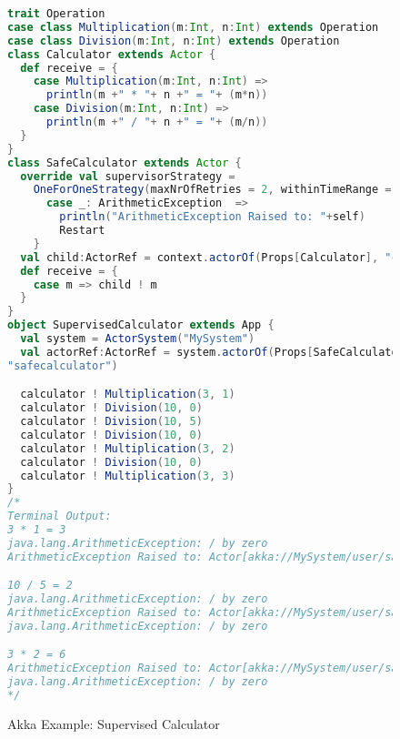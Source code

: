 \begin{figure}[!p]

  \begin{lstlisting}[language=scala]
trait Operation
case class Multiplication(m:Int, n:Int) extends Operation
case class Division(m:Int, n:Int) extends Operation
class Calculator extends Actor {
  def receive = {
    case Multiplication(m:Int, n:Int) =>
      println(m +" * "+ n +" = "+ (m*n))
    case Division(m:Int, n:Int) =>
      println(m +" / "+ n +" = "+ (m/n))
  }
}
class SafeCalculator extends Actor {
  override val supervisorStrategy =
    OneForOneStrategy(maxNrOfRetries = 2, withinTimeRange = 1 minute) {
      case _: ArithmeticException  =>
        println("ArithmeticException Raised to: "+self)
        Restart
    }
  val child:ActorRef = context.actorOf(Props[Calculator], "child")
  def receive = {
    case m => child ! m
  }
}
object SupervisedCalculator extends App {
  val system = ActorSystem("MySystem")
  val actorRef:ActorRef = system.actorOf(Props[SafeCalculator],
"safecalculator")

  calculator ! Multiplication(3, 1)
  calculator ! Division(10, 0)
  calculator ! Division(10, 5)
  calculator ! Division(10, 0)
  calculator ! Multiplication(3, 2)
  calculator ! Division(10, 0)
  calculator ! Multiplication(3, 3)
}
/*
Terminal Output:
3 * 1 = 3
java.lang.ArithmeticException: / by zero
ArithmeticException Raised to: Actor[akka://MySystem/user/safecalculator]

10 / 5 = 2
java.lang.ArithmeticException: / by zero
ArithmeticException Raised to: Actor[akka://MySystem/user/safecalculator]
java.lang.ArithmeticException: / by zero

3 * 2 = 6
ArithmeticException Raised to: Actor[akka://MySystem/user/safecalculator]
java.lang.ArithmeticException: / by zero
*/
    \end{lstlisting}
  \caption{Akka Example: Supervised Calculator}
  \label{supervisedcalculator}
\end{figure}